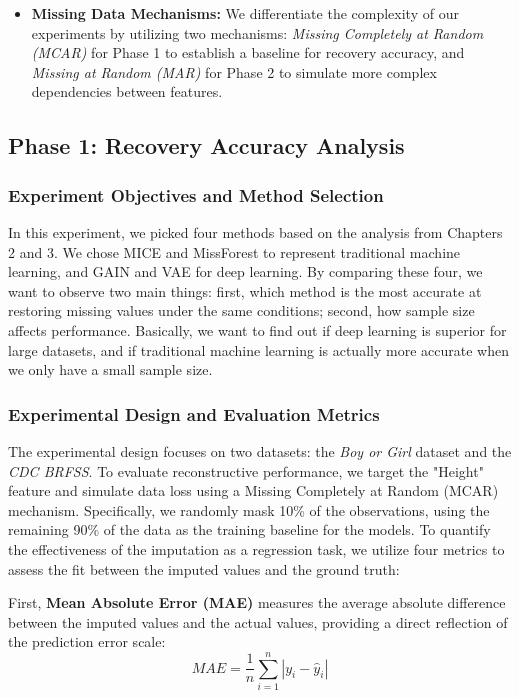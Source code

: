 \documentclass[twocolumn, 9pt]{extarticle}
\begin{document}
\begin{itemize}
    \item \textbf{Missing Data Mechanisms:} We differentiate the complexity of our experiments by utilizing two mechanisms: \textit{Missing Completely at Random (MCAR)} for Phase 1 to establish a baseline for recovery accuracy, and \textit{Missing at Random (MAR)} for Phase 2 to simulate more complex dependencies between features.
\end{itemize}

\subsection{Phase 1: Recovery Accuracy Analysis}
\subsubsection{Experiment Objectives and Method Selection}
In this experiment, we picked four methods based on the analysis from Chapters 2 and 3. We chose MICE and MissForest to represent traditional machine learning, and GAIN and VAE for deep learning. By comparing these four, we want to observe two main things: first, which method is the most accurate at restoring missing values under the same conditions; second, how sample size affects performance. Basically, we want to find out if deep learning is superior for large datasets, and if traditional machine learning is actually more accurate when we only have a small sample size.

\subsubsection{Experimental Design and Evaluation Metrics}

The experimental design focuses on two datasets: the \textit{Boy or Girl} dataset and the \textit{CDC BRFSS}. To evaluate reconstructive performance, we target the "Height" feature and simulate data loss using a Missing Completely at Random (MCAR) mechanism. Specifically, we randomly mask 10\% of the observations, using the remaining 90\% of the data as the training baseline for the models.
To quantify the effectiveness of the imputation as a regression task, we utilize four metrics to assess the fit between the imputed values and the ground truth:

First, \textbf{Mean Absolute Error (MAE)} measures the average absolute difference between the imputed values and the actual values, providing a direct reflection of the prediction error scale:
\begin{equation}
MAE = \frac{1}{n} \sum_{i=1}^{n} |y_i - \hat{y}_i|
\end{equation}
\end{document}
